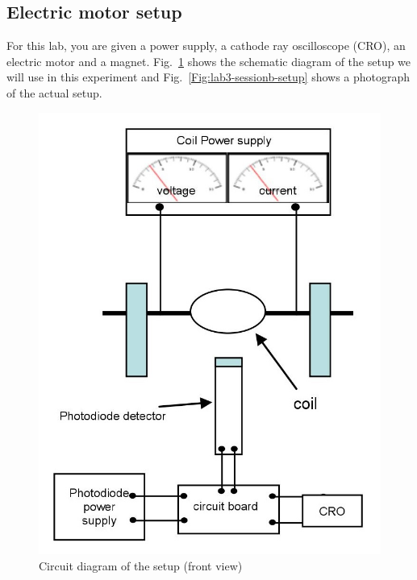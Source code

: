 \documentclass[12pt]{report}
\begin{document}
\subsection{Electric motor setup}
For this lab, you are given a power supply, a cathode ray oscilloscope (CRO), an electric motor and a magnet. 
Fig.~\ref{Fig:lab3-sessionb-diagram} shows the schematic diagram of the setup we will use in this experiment and Fig.~\ref{Fig:lab3-sessionb-setup} shows a photograph of the actual setup. 

\begin{figure}[h]
\centering
\includegraphics[scale=1.1]{lab3-sessionb-diagram}
\caption{Circuit diagram of the setup (front view)}
\label{Fig:lab3-sessionb-diagram}
\end{figure}
\end{document}
